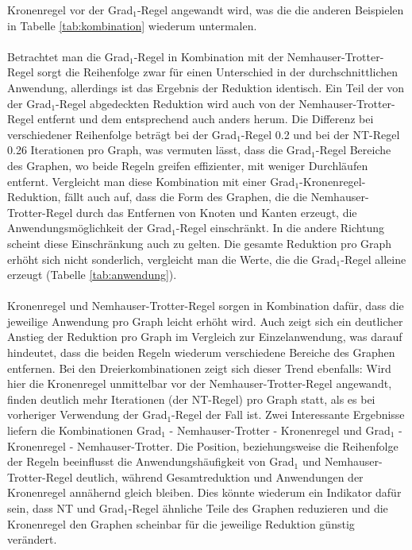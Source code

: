Kronenregel vor der Grad$_{1}$-Regel angewandt wird, was die die anderen Beispielen in Tabelle \ref{tab:kombination} wiederum untermalen.\\ \\
Betrachtet man die Grad$_{1}$-Regel in Kombination mit der Nemhauser-Trotter-Regel sorgt die Reihenfolge zwar für einen Unterschied in der durchschnittlichen Anwendung, allerdings ist das Ergebnis der Reduktion identisch. Ein Teil der von der Grad$_{1}$-Regel abgedeckten Reduktion wird auch von der Nemhauser-Trotter-Regel entfernt und dem entsprechend auch anders herum. Die Differenz bei verschiedener Reihenfolge beträgt bei der Grad$_{1}$-Regel 0.2 und bei der NT-Regel 0.26 Iterationen pro Graph, was vermuten lässt, dass die Grad$_{1}$-Regel Bereiche des Graphen, wo beide Regeln greifen effizienter, mit weniger Durchläufen entfernt. Vergleicht man diese Kombination mit einer Grad$_{1}$-Kronenregel-Reduktion, fällt auch auf, dass die Form des Graphen, die die Nemhauser-Trotter-Regel durch das Entfernen von Knoten und Kanten erzeugt, die Anwendungsmöglichkeit der Grad$_{1}$-Regel einschränkt. In die andere Richtung scheint diese Einschränkung auch zu gelten. Die gesamte Reduktion pro Graph erhöht sich nicht sonderlich, vergleicht man die Werte, die die Grad$_{1}$-Regel alleine erzeugt (Tabelle \ref{tab:anwendung}). \\ \\
Kronenregel und Nemhauser-Trotter-Regel sorgen in Kombination dafür, dass die jeweilige Anwendung pro Graph leicht erhöht wird. Auch zeigt sich ein deutlicher Anstieg der Reduktion pro Graph im Vergleich zur Einzelanwendung, was darauf hindeutet, dass die beiden Regeln wiederum verschiedene Bereiche des Graphen entfernen. Bei den Dreierkombinationen zeigt sich dieser Trend ebenfalls: Wird hier die Kronenregel unmittelbar vor der Nemhauser-Trotter-Regel angewandt, finden deutlich mehr Iterationen (der NT-Regel) pro Graph statt, als es bei vorheriger Verwendung der Grad$_{1}$-Regel der Fall ist. Zwei Interessante Ergebnisse liefern die Kombinationen Grad$_{1}$ - Nemhauser-Trotter - Kronenregel und Grad$_{1}$ - Kronenregel - Nemhauser-Trotter. Die Position, beziehungsweise die Reihenfolge der Regeln beeinflusst die Anwendungshäufigkeit von Grad$_{1}$ und Nemhauser-Trotter-Regel deutlich, während Gesamtreduktion und Anwendungen der Kronenregel annähernd gleich bleiben. Dies könnte wiederum ein Indikator dafür sein, dass NT und Grad$_{1}$-Regel ähnliche Teile des Graphen reduzieren und die Kronenregel den Graphen scheinbar für die jeweilige Reduktion günstig verändert.


